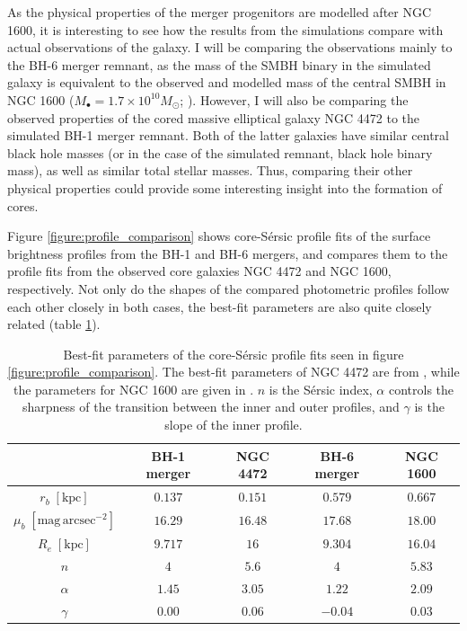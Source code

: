 \documentclass[english, twoside]{HYgradu}
\begin{document}
As the physical properties of the merger progenitors are modelled after NGC 1600, it is interesting to see how the results from the simulations compare with actual observations of the galaxy. I will be comparing the observations mainly to the BH-6 merger remnant, as the mass of the SMBH binary in the simulated galaxy is equivalent to the observed and modelled mass of the central SMBH in NGC 1600 ($M_\bullet = 1.7 \times 10^{10} M_\odot$; \citealt{Thomas2016}). However, I will also be comparing the observed properties of the cored massive elliptical galaxy NGC 4472 to the simulated BH-1 merger remnant. Both of the latter galaxies have similar central black hole masses (or in the case of the simulated remnant, black hole binary mass), as well as similar total stellar masses. Thus, comparing their other physical properties could provide some interesting insight into the formation of cores.

Figure \ref{figure:profile_comparison} shows core-Sérsic profile fits of the surface brightness profiles from the BH-1 and BH-6 mergers, and compares them to the profile fits from the observed core galaxies NGC 4472 and NGC 1600, respectively. Not only do the shapes of the compared photometric profiles follow each other closely in both cases, the best-fit parameters are also quite closely related (table \ref{table:bestfit_parameter_comparison}). 

\begin{table}
	\begin{center}
		\scriptsize
		\begin{tabular}{| c | c c | c c |}
		\hline
		 & BH-1 merger & NGC 4472 & BH-6 merger & NGC 1600 \\
		\hline
		$r_b \; \mathrm{[kpc]}$ & $0.137$ & $0.151$ & $0.579$ & $0.667$ \\
		$\mu_b \; \mathrm{[mag \, arcsec^{-2}]}$ & $16.29$ & $16.48$ & $17.68$ & $18.00$ \\
		$R_e \; \mathrm{[kpc]}$ & $9.717$ & $16$ & $9.304$ & $16.04$ \\
		$n$ & $4$ & $5.6$ & $4$ & $5.83$ \\
		$\alpha$ & $1.45$ & $3.05$ & $1.22$ & $2.09$ \\
		$\gamma$ & $0.00$ & $0.06$ & $-0.04$ & $0.03$ \\
		\hline
		\end{tabular}
	\end{center}
	\caption{Best-fit parameters of the core-Sérsic profile fits seen in figure \ref{figure:profile_comparison}. The best-fit parameters of NGC 4472 are from \cite{Rusli2013}, while the parameters for NGC 1600 are given in \cite{Thomas2016}. $n$ is the Sérsic index, $\alpha$ controls the sharpness of the transition between the inner and outer profiles, and $\gamma$ is the slope of the inner profile.}
	\label{table:bestfit_parameter_comparison}
\end{table}
\end{document}
